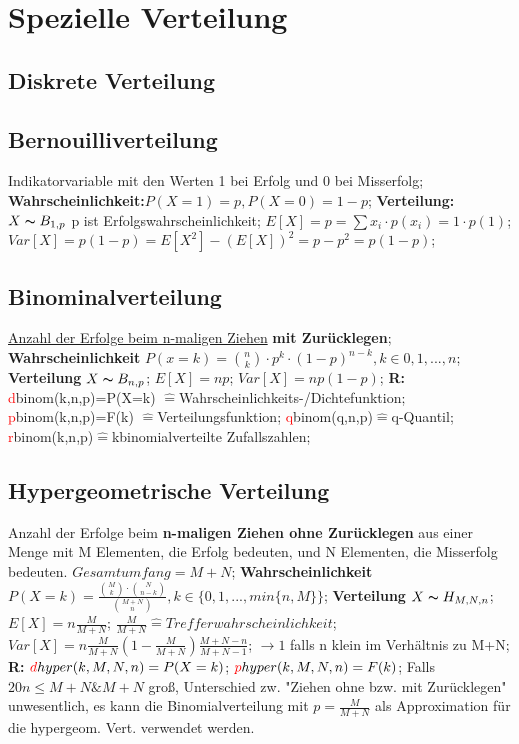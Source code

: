 \section{Spezielle Verteilung}
\subsection{Diskrete Verteilung}
\subsection{Bernouilliverteilung}
Indikatorvariable mit den Werten 1 bei Erfolg und 0 bei Misserfolg;
\textbf{Wahrscheinlichkeit:}$P(X=1) = p, P(X=0)  = 1 - p$; 
\textbf{Verteilung:} $X \thicksim B_{1,p}$ p ist Erfolgswahrscheinlichkeit; 
$E[X] = p = \sum x_{i} \cdot p(x_{i}) = 1 \cdot p(1)$; 
$Var[X] = p(1-p)  = E[X^2] -(E[X])^2 = p - p^2 = p(1-p)$; 
\subsection{Binominalverteilung}
\underline{Anzahl der Erfolge beim n-maligen Ziehen} \textbf{mit Zurücklegen};
\textbf{Wahrscheinlichkeit} $ P(x = k ) =  \binom{n}{k} \cdot p^k \cdot (1-p)^{n-k}, k \in {0, 1, ..., n}$; 
\textbf{Verteilung} $ X \thicksim B_{n, p}$; 
$E[X] = np$; 
$ Var[X] = np(1-p) $; 
\textbf{R:}
\textcolor{red}{d}binom(k,n,p)=P(X=k) $\hat{=}$Wahrscheinlichkeits-/Dichtefunktion; 
\textcolor{red}{p}binom(k,n,p)=F(k) $\hat{=}$Verteilungsfunktion; 
\textcolor{red}{q}binom(q,n,p)$\hat{=}$q-Quantil; 
\textcolor{red}{r}binom(k,n,p)$\hat{=}$kbinomialverteilte Zufallszahlen; 
\subsection{Hypergeometrische Verteilung}
Anzahl der Erfolge beim \textbf{n-maligen Ziehen ohne Zurücklegen} aus einer Menge mit M Elementen, die Erfolg bedeuten, und N Elementen, die Misserfolg bedeuten. $Gesamtumfang = M + N$;
\textbf{Wahrscheinlichkeit}
$ P(X=k) = \frac{\binom{M}{k} \cdot \binom{N}{n-k}}{\binom{M+N}{n}}, k \in \{0, 1, ..., min\{n,M\}\}$;
\textbf{Verteilung} $ X \thicksim H_{M, N, n}$; $E[X] = n \frac{M}{M+N}$; $\frac{M}{M+N} \hat{=} Trefferwahrscheinlichkeit$; $Var[X] = n \frac{M}{M+N}( 1 - \frac{M}{M+N}) \frac{M+N-n}{M+N-1}$; $\rightarrow 1$ falls n klein im Verhältnis zu M+N;
\textbf{R:}
$\textcolor{red}{d}hyper(k,M,N,n)=P(X=k)$;
$\textcolor{red}{p}hyper(k,M,N,n)=F(k)$;
Falls $ 20n \le M + N \& M + N $ groß, Unterschied zw. "Ziehen ohne bzw. mit Zurücklegen" unwesentlich, es kann die Binomialverteilung mit $ p = \frac{M}{M+N} $ als Approximation für die hypergeom. Vert. verwendet werden.
